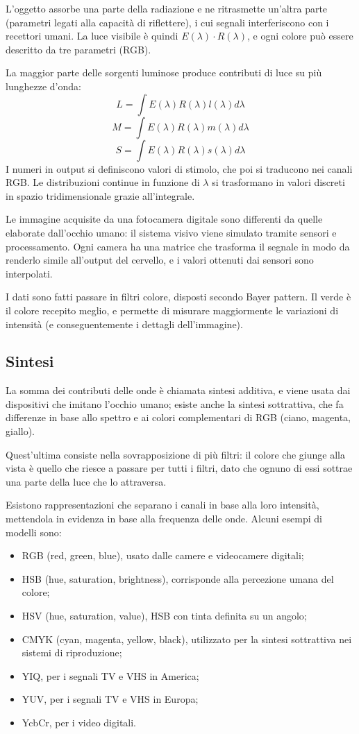 L'oggetto assorbe una parte della radiazione e ne ritrasmette un'altra parte (parametri legati alla capacità di riflettere), i cui segnali interferiscono con i recettori umani. La luce visibile è quindi $E(\lambda) \cdot R(\lambda)$, e ogni colore può essere descritto da tre parametri (RGB).

La maggior parte delle sorgenti luminose produce contributi di luce su più lunghezze d'onda:
$$L = \int E(\lambda) R(\lambda) l(\lambda) d\lambda$$
$$M = \int E(\lambda) R(\lambda) m(\lambda) d\lambda$$
$$S = \int E(\lambda) R(\lambda) s(\lambda) d\lambda$$
I numeri in output si definiscono valori di stimolo, che poi si traducono nei canali RGB. Le distribuzioni continue in funzione di $\lambda$ si trasformano in valori discreti in spazio tridimensionale grazie all'integrale.

Le immagine acquisite da una fotocamera digitale sono differenti da quelle elaborate dall'occhio umano: il sistema visivo viene simulato tramite sensori e processamento. Ogni camera ha una matrice che trasforma il segnale in modo da renderlo simile all'output del cervello, e i valori ottenuti dai sensori sono interpolati. 

I dati sono fatti passare in filtri colore, disposti secondo Bayer pattern. Il verde è il colore recepito meglio, e permette di misurare maggiormente le variazioni di intensità (e conseguentemente i dettagli dell'immagine). 

\subsection{Sintesi}
La somma dei contributi delle onde è chiamata sintesi additiva, e viene usata dai dispositivi che imitano l'occhio umano; esiste anche la sintesi sottrattiva, che fa differenze in base allo spettro e ai colori complementari di RGB (ciano, magenta, giallo). 

Quest'ultima consiste nella sovrapposizione di più filtri: il colore che giunge alla vista è quello che riesce a passare per tutti i filtri, dato che ognuno di essi sottrae una parte della luce che lo attraversa. 


Esistono rappresentazioni che separano i canali in base alla loro intensità, mettendola in evidenza in base alla frequenza delle onde. Alcuni esempi di modelli sono:
\begin{itemize}
	\item RGB (red, green, blue), usato dalle camere e videocamere digitali;
	\item HSB (hue, saturation, brightness), corrisponde alla percezione umana del colore;
	\item HSV (hue, saturation, value), HSB con tinta definita su un angolo;
	\item CMYK (cyan, magenta, yellow, black), utilizzato per la sintesi sottrattiva nei sistemi di riproduzione;
	\item YIQ, per i segnali TV e VHS in America;
	\item YUV, per i segnali TV e VHS in Europa;
	\item YcbCr, per i video digitali.
\end{itemize}


